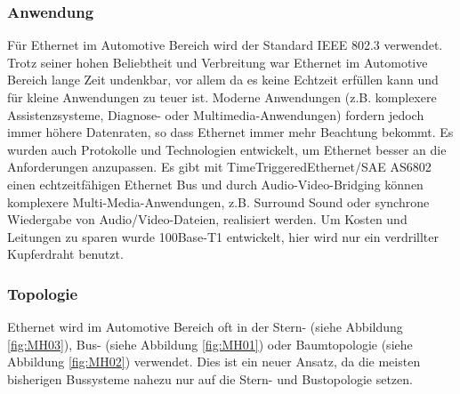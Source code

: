     \subsubsection{Anwendung}
    Für Ethernet im Automotive Bereich wird der Standard IEEE 802.3 verwendet. Trotz seiner hohen Beliebtheit und 
    Verbreitung war Ethernet im Automotive Bereich lange Zeit undenkbar, vor allem da es keine
     Echtzeit erfüllen kann und für kleine Anwendungen zu teuer ist. Moderne Anwendungen (z.B. komplexere Assistenzsysteme, Diagnose- oder Multimedia-Anwendungen) fordern jedoch immer höhere Datenraten, so dass Ethernet immer mehr Beachtung bekommt. Es wurden auch Protokolle und Technologien entwickelt, um Ethernet besser an die Anforderungen anzupassen. Es gibt mit TimeTriggeredEthernet/SAE AS6802 einen echtzeitfähigen Ethernet Bus und durch Audio-Video-Bridging können komplexere Multi-Media-Anwendungen, z.B. Surround Sound oder synchrone Wiedergabe von Audio/Video-Dateien, realisiert werden. Um Kosten und Leitungen zu sparen wurde 100Base-T1 entwickelt, hier wird nur ein verdrillter Kupferdraht benutzt. \cite{.MH_Ethernet} \cite{.MH_Review}
    
    \subsubsection{Topologie}
    Ethernet wird im Automotive Bereich oft in der Stern- (siehe Abbildung \ref{fig:MH03}), Bus- (siehe Abbildung \ref{fig:MH01}) oder Baumtopologie (siehe Abbildung \ref{fig:MH02}) verwendet. Dies ist ein neuer Ansatz, da die meisten bisherigen Bussysteme nahezu nur auf die Stern- und Bustopologie setzen.
    \cite{.MH_Review}
    
